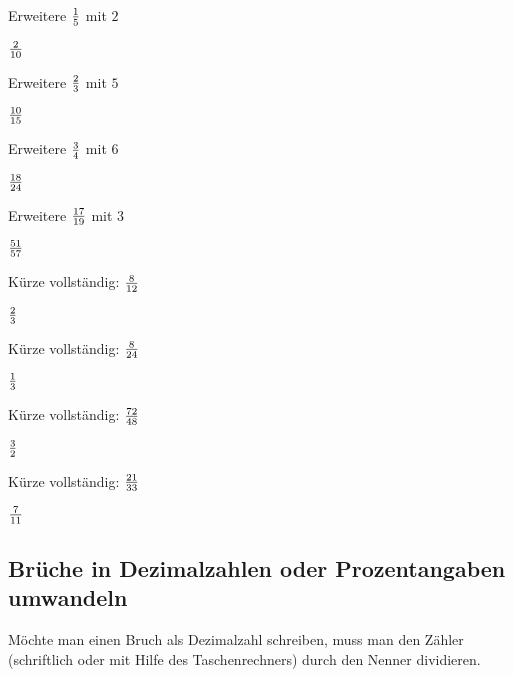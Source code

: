\documentclass[
  ngerman,
]{book}
\begin{document}
Erweitere \(1 \over 5\) mit \(2\)

\leavevmode\hypertarget{toggleText1}{}%
\(2 \over 10\)

Erweitere \(2 \over 3\) mit \(5\)

\leavevmode\hypertarget{toggleText2}{}%
\(10 \over 15\)

Erweitere \(3 \over 4\) mit \(6\)

\leavevmode\hypertarget{toggleText3}{}%
\(18 \over 24\)

Erweitere \(17 \over 19\) mit \(3\)

\leavevmode\hypertarget{toggleText4}{}%
\(51 \over 57\)

Kürze vollständig: \(8 \over 12\)

\leavevmode\hypertarget{toggleText5}{}%
\(2 \over 3\)

Kürze vollständig: \(8 \over 24\)

\leavevmode\hypertarget{toggleText6}{}%
\(1 \over 3\)

Kürze vollständig: \(72 \over 48\)

\leavevmode\hypertarget{toggleText7}{}%
\(3 \over 2\)

Kürze vollständig: \(21 \over 33\)

\leavevmode\hypertarget{toggleText8}{}%
\(7 \over 11\)

\hypertarget{section-1}{%
\subsubsection*{}\label{section-1}}

\hypertarget{section-2}{%
\subsubsection*{}\label{section-2}}

\hypertarget{bruxfcche-in-dezimalzahlen-oder-prozentangaben-umwandeln}{%
\subsection*{Brüche in Dezimalzahlen oder Prozentangaben umwandeln}\label{bruxfcche-in-dezimalzahlen-oder-prozentangaben-umwandeln}}

Möchte man einen Bruch als Dezimalzahl schreiben, muss man den Zähler (schriftlich oder mit Hilfe des Taschenrechners) durch den Nenner dividieren.
\end{document}
